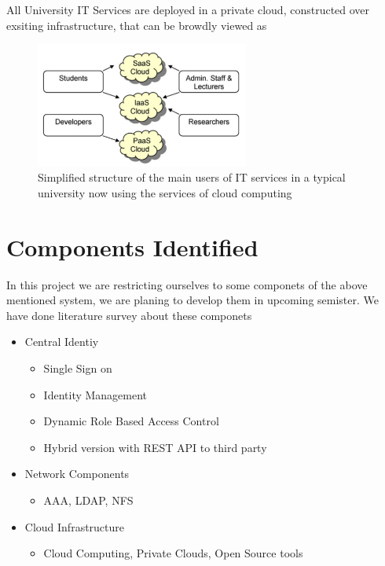\documentclass[12pt]{report}
\begin{document}
	All University IT Services are deployed in a private cloud, constructed over exsiting infrastructure, that can be browdly viewed as 
	
\begin{figure}[H]
\begin{center}
\includegraphics[width=7cm]{./it2.png}
\caption{ Simplified structure of the main users of IT services in a typical university now using the services of cloud computing\label{fig:Simplified structure of the main users of IT services in a typical university now using the services of cloud computing. }}
\end{center}
\end{figure}	
	
	
\section{Components Identified}

In this project we are restricting ourselves to some componets of the above mentioned system, we are planing to develop them in upcoming semister. We have done literature survey about these componets

\begin{itemize}
	\item Central Identiy 
	\begin{itemize}
		\item Single Sign on
		\item Identity Management
		\item Dynamic Role Based Access Control
		\item Hybrid version with REST API to third party 
	\end{itemize}
	\item Network Components
	\begin{itemize}
		\item AAA, LDAP, NFS
	\end{itemize}
	\item Cloud Infrastructure
	\begin{itemize}
		\item Cloud Computing, Private Clouds, Open Source tools 
	\end{itemize}
\end{itemize}
\end{document}
